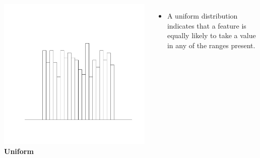\documentclass[xcolor={table}]{beamer}
\begin{document}
\begin{frame} 
	\begin{columns}[t]
		 
			\centering
			\includegraphics[width=1.0\textwidth]{./images/HistogramShapes_uniform.pdf} \\
			\tiny \textbf{Uniform}

		\begin{itemize}
			\item A uniform distribution indicates that a feature is equally likely to take a value in any of the ranges present. 
		\end{itemize}
	\end{columns}
\end{frame} 
\end{document}
